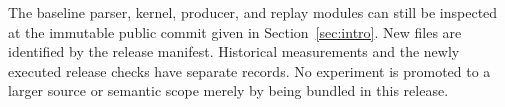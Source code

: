 The baseline parser, kernel, producer, and replay modules can still be inspected at the immutable public commit given in Section~\ref{sec:intro}. New files are identified by the release manifest. Historical measurements and the newly executed release checks have separate records. No experiment is promoted to a larger source or semantic scope merely by being bundled in this release.
